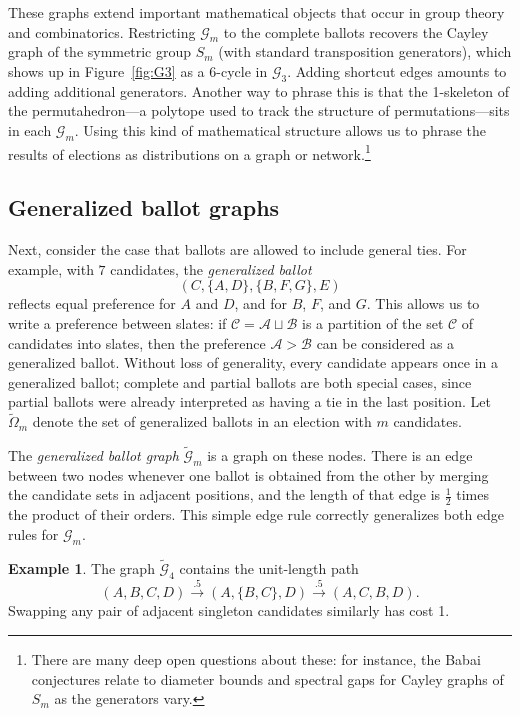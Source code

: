 \documentclass{amsart}
\newcommand{\G}{\mathcal{G}}
\newcommand{\WG}{\widetilde{\mathcal{G}}}
\newcommand{\WO}{\widetilde{\Omega}}
\theoremstyle{plain}
\theoremstyle{definition}
\newtheorem{example}[theorem]{Example}
\theoremstyle{remark}
\begin{document}
These graphs extend important mathematical objects that occur in group theory and combinatorics.  Restricting $\G_m$ to the complete ballots recovers the Cayley graph of the symmetric group $S_m$ (with standard transposition generators), which shows up in Figure~\ref{fig:G3} as a $6$-cycle in $\G_3$.  Adding shortcut edges amounts to adding additional generators.  
Another way to phrase this is that the 1-skeleton of the permutahedron---a polytope used to track the structure of permutations---sits in each $\G_m$. Using this kind of mathematical structure allows us to phrase the results of elections as distributions on a graph or network.\footnote{There are many deep open questions about these:  for instance, the Babai conjectures relate to diameter bounds and spectral gaps for Cayley graphs of $S_m$ as the generators vary.}

\subsection{Generalized ballot graphs}\label{sec:gen_graph}
Next, consider the case that ballots are allowed to include general ties.  For example, with $7$ candidates, the \emph{generalized ballot} 
$$ (C,\{A,D\},\{B,F,G\},E)$$
reflects  equal preference for $A$ and $D$, and for $B$, $F$, and $G$.
This allows us to write a preference between slates:  if 
$\mathcal C=\mathcal A \sqcup \mathcal B$ is a partition of the set $\mathcal C$ of candidates into slates, 
then the preference $\mathcal A>\mathcal B$ 
can be considered as a generalized ballot.
Without loss of generality, every candidate appears once in a generalized ballot;
complete and partial ballots are both special cases, since partial ballots were already interpreted as having a tie in the last position.
Let $\WO_m$ denote the set of generalized ballots in an election with $m$ candidates.  

The \emph{generalized ballot graph} $\WG_m$ is a graph on these nodes. There is an edge between two nodes whenever one ballot is obtained from the other by merging the  candidate sets in adjacent positions, and the length of that edge is  $\frac 12$ times the product of their orders.  This simple edge rule correctly generalizes both edge rules for $\G_m$. 

\begin{example}\label{E:yaya}
The graph $\WG_4$ contains the unit-length path
$$(A,B,C,D)\stackrel{.5}{\rightarrow}(A,\{B,C\},D)\stackrel{.5}{\rightarrow}(A,C,B,D).$$
Swapping  any pair of adjacent singleton candidates similarly has cost 1.  
\end{example}
\end{document}
